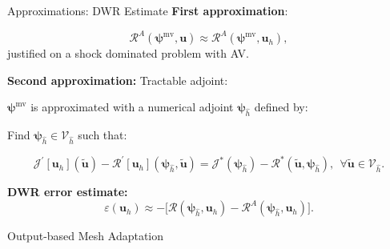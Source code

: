 \documentclass{beamer}
\newcounter{sectionframecount}
\begin{document}
\begin{frame}[t]{Approximations: DWR Estimate}
  \vspace{-10pt}
  \textbf{First approximation}:

  \begin{equation}
    \mathcal{R}^A(\boldsymbol{\psi}^\text{mv},\boldsymbol{u}) \approx
    \mathcal{R}^A(\boldsymbol{\psi}^\text{mv},\boldsymbol{u}_h),
  \end{equation}
  justified on a shock dominated problem with AV.

  \vspace{5pt}
  \textbf{Second approximation:} Tractable adjoint:

  \vspace{10pt}
  $\boldsymbol{\psi}^\text{mv}$ is approximated with a numerical adjoint $\boldsymbol{\psi}_{\hat{h}}$ defined by\footnotemark:

  Find $\boldsymbol{\psi}_{\hat{h}} \in \mathcal{V}_{\hat{h}}$ such that:

\begin{equation}
  \mathcal{J}^\prime[\boldsymbol{u}_h](\tilde{\boldsymbol{u}}) - \mathcal{R}^\prime[\boldsymbol{u}_h](\boldsymbol{\psi}_{\hat{h}},\tilde{\boldsymbol{u}}) = \mathcal{J}^*(\boldsymbol{\psi}_{\hat{h}}) - \mathcal{R}^*(\tilde{\boldsymbol{u}},\boldsymbol{\psi}_{\hat{h}}),~~\forall \tilde{\boldsymbol{u}} \in \mathcal{V}_{\hat{h}}.
\end{equation}

\vspace{10pt}
\textbf{DWR error estimate:}
\begin{equation}
  \varepsilon(\boldsymbol{u}_h) \approx -\Big[\mathcal{R}(\boldsymbol{\psi}_{\hat{h}},\boldsymbol{u}_h) - \mathcal{R}^A(\boldsymbol{\psi}_{\hat{h}},\boldsymbol{u}_h)\Big].
\end{equation}


\end{frame}


\begin{frame}[plain]
  \vfill
  \centering
  {Output-based Mesh Adaptation}
  \vfill
\end{frame}
\end{document}
